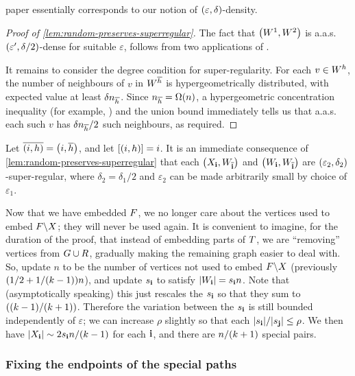\documentclass[11pt,english]{article}
\theoremstyle{plain}
\theoremstyle{plain}
\theoremstyle{plain}
\theoremstyle{plain}
\theoremstyle{plain}
\theoremstyle{definition}
\theoremstyle{definition}
\theoremstyle{remark}
\theoremstyle{remark}
\theoremstyle{plain}
\theoremstyle{definition}
\theoremstyle{definition}
\theoremstyle{plain}
\theoremstyle{plain}
\theoremstyle{plain}
\theoremstyle{plain}
\theoremstyle{remark}
\theoremstyle{plain}
\theoremstyle{definition}
\let\originalleft\left
\let\originalright\right
\renewcommand{\left}{\mathopen{}\mathclose\bgroup\originalleft}
\renewcommand{\right}{\aftergroup\egroup\originalright}
\begin{document}
paper essentially corresponds to our notion of $\left(\varepsilon,\delta\right)$-density.
\begin{proof}[Proof of \ref{lem:random-preserves-superregular}]
The fact that $\left(W^{1},W^{2}\right)$ is a.a.s. $\left(\varepsilon',\delta/2\right)$-dense
for suitable $\varepsilon$, follows from two applications of \cite[Theorem~3.6]{GKRS07}.

It remains to consider the degree condition for super-regularity.
For each $v\in W^{h}$, the number of neighbours of $v$ in $W^{\overline{h}}$
is hypergeometrically distributed, with expected value at least $\delta n_{\overline{h}}$.
Since $n_{\flip h}=\Omega\left(n\right)$, a hypergeometric concentration
inequality (for example, \cite[Theorem 2.10]{JLR00}) and the union
bound immediately tells us that a.a.s. each such $v$ has $\delta n_{\overline{h}}/2$
such neighbours, as required.
\end{proof}
Let $\flip{\left(i,\h\right)}=\left(i,\flip{\h}\right)$, and let
$\left[\left(i,\h\right)\right]=i$. It is an immediate consequence
of \ref{lem:random-preserves-superregular} that each $\left(X_{\bi},W_{\flip{\bi}}\right)$
and $\left(W_{\bi},W_{\flip{\bi}}\right)$ are $\left(\varepsilon_{2},\delta_{2}\right)$-super-regular,
where $\delta_{2}=\delta_{1}/2$ and $\varepsilon_{2}$ can be made
arbitrarily small by choice of $\varepsilon_{1}$.

Now that we have embedded $F$, we no longer care about the vertices
used to embed $F\backslash X$; they will never be used again. It
is convenient to imagine, for the duration of the proof, that instead
of embedding parts of $T$, we are ``removing'' vertices from $G\cup R$,
gradually making the remaining graph easier to deal with. So, update
$n$ to be the number of vertices not used to embed $F\backslash X$
(previously $\left(1/2+1/\left(k-1\right)\right)n$), and update $s_{\mathbf{i}}$
to satisfy $\left|W_{\bi}\right|=s_{\bi}n$. Note that (asymptotically
speaking) this just rescales the $s_{\mathbf{i}}$ so that they sum to $\left(\left(k-1\right)/\left(k+1\right)\right)$.
Therefore the variation between the $s_{\mathbf{i}}$ is still bounded independently
of $\varepsilon$; we can increase $\rho$ slightly so that each $\left|s_{\bi}\right|/\left|s_{\bj}\right|\le\rho$.
We then have $\left|X_{\bi}\right|\sim2s_{\bi}n/\left(k-1\right)$
for each $\mathbf{i}$, and there are $n/\left(k+1\right)$ special pairs.


\subsubsection{\label{sub:fix-endpoints}Fixing the endpoints of the special paths}
\end{document}
